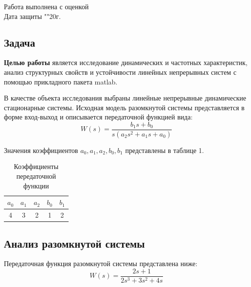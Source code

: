 \documentclass[a4paper, 12pt]{article}
\begin{document}
\begin{titlepage}
		Работа выполнена с оценкой \hspace{1cm} \underline{\hspace{8cm}} \\ 
		\vspace{1cm}
		Дата защиты "\underline{\hspace{0.7cm}}"\hspace{0.2cm}\underline{\hspace{2cm}}\hspace{0.2cm}20\underline{\hspace{0.7cm}}г.

\end{titlepage}

\begin{center}
\section*{Задача}
\end{center} \par
\textbf{Целью работы} является исследование динамических и частотных характеристик, анализ структурных свойств и устойчивости линейных непрерывных систем с помощью прикладного пакета matlab. \par
В качестве объекта исследования выбраны линейные непрерывные динамические стационарные системы. Исходная модель разомкнутой системы представляется в форме вход-выход и описывается передаточной функцией вида: 
\begin{equation} 
    W(s) = \frac{b_1s + b_0}{s(a_2s^2 + a_1s + a_0)}
\end{equation} \par
Значения коэффициентов $a_0, a_1, a_2, b_0, b_1$ представлены в таблице 1. \par
\begin{table} [h!]
    \centering
    \begin{threeparttable}
        \caption{Коэффициенты передаточной функции}
        \begin{tabular}{|c|c|c|c|c|}
            \hline
            $a_0$ & $a_1$ & $a_2$ & $b_0$ & $b_1$ \\ \hline
            4 & 3 & 2 & 1 & 2 \\ \hline
        \end{tabular}
    \end{threeparttable}
\end{table}

\newpage
\begin{center}
\section{Анализ разомкнутой системы}
\end{center} \par
Передаточная функция разомкнутой системы представлена ниже:
\begin{equation}
    W(s) = \frac{2s + 1}{2s^3 + 3s^2 + 4s}
\end{equation}
\end{document}
